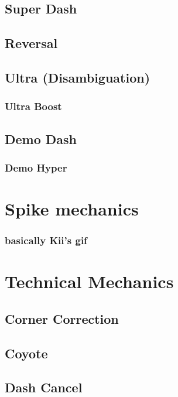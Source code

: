 \documentclass[oneside]{book}
\begin{document}
\section{Super Dash}

\section{Reversal}

\section{Ultra (Disambiguation)}

\subsection{Ultra Boost}

\section{Demo Dash}

\subsection{Demo Hyper}

\chapter{Spike mechanics}

\subsection{basically Kii's gif}

\chapter{Technical Mechanics}

\section{Corner Correction}

\section{Coyote}

\section{Dash Cancel}
\end{document}
